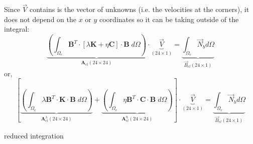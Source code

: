 Since $\vec V$ contains is the vector of unknowns (i.e. the velocities at the corners), 
it does not depend on the $x$ or $y$ coordinates
so it can be taking outside of the integral:
\[
\underbrace{
\left(\int_{\Omega_e} {\bm B}^T \cdot [ \lambda {\bm K} + \eta {\bm C} ] \cdot {\bm B} \;  d\Omega \right) 
}_{\bm A_{el}(24 \times 24)}
\cdot 
\underbrace{
{\vec V}
}_{(24\times 1)}
=
\underbrace{
\int_{\Omega_e} {\vec N}_b d\Omega 
}_{\vec B_{el} (24\times 1)}
\]
or, 
\[
\left[
\underbrace{
\left(\int_{\Omega_e} \lambda {\bm B}^T \cdot {\bm K} \cdot {\bm B} \; d\Omega \right) 
}_{\bm A_{el}^\lambda(24 \times 24)}
+
\underbrace{
\left(\int_{\Omega_e}  \eta {\bm B}^T \cdot {\bm C}  \cdot {\bm B} \;  d\Omega \right) 
}_{\bm A_{el}^\eta(24 \times 24)}
\right]
\cdot 
\underbrace{
{\vec V}
}_{(24\times 1)}
=
\underbrace{
\int_{\Omega_e} {\vec N}_b d\Omega 
}_{\vec B_{el} (24\times 1)}
\]


reduced integration \cite{hulb79}


